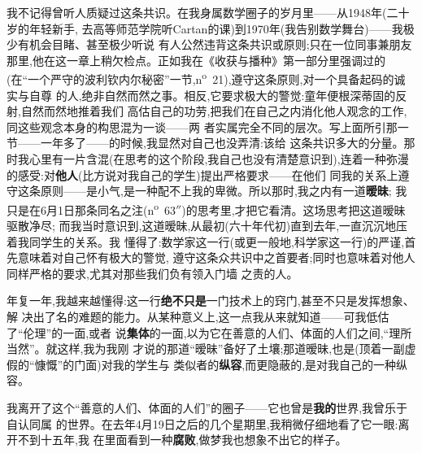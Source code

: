 我不记得曾听人质疑过这条共识。在我身属数学圈子的岁月里——从1948年(二十岁的年轻新手,
去高等师范学院听Cartan的课)到1970年(我告别数学舞台)——我极少有机会目睹、甚至极少听说
有人公然违背这条共识或原则;只在一位同事兼朋友那里,他在这一章上稍欠检点。正如我在《收获与播种》第一部分里强调过的
(在“一个严守的波利钦内尔秘密”一节,n\textsuperscript{o}~21),遵守这条原则,对一个具备起码的诚实与自尊
的人,绝非自然而然之事。相反,它要求极大的警觉:童年便根深蒂固的反射,自然而然地推着我们
高估自己的功劳,把我们在自己之内消化他人观念的工作,同这些观念本身的构思混为一谈——两
者实属完全不同的层次。写上面所引那一节——一年多了——的时候,我显然对自己也没弄清:该给
这条共识多大的分量。那时我心里有一片含混(在思考的这个阶段,我自己也没有清楚意识到\dmark{}),连着一种弥漫的感受:对\textbf{他人}(比方说对我自己的学生)提出严格要求——在他们
同我的关系上遵守这条原则——是小气,是一种配不上我的卑微。所以那时,我之内有一道\textbf{暧昧};
我只是在6月1日那条同名之注(n\textsuperscript{o}~63$''$)的思考里,才把它看清。这场思考把这道暧昧驱散净尽;
而我当时意识到,这道暧昧,从最初(六十年代初)直到去年,一直沉沉地压着我同学生的关系。我
懂得了:数学家这一行(或更一般地,科学家这一行)的严谨,首先意味着对自己怀有极大的警觉,
遵守这条众共识中之首要者;同时也意味着对他人同样严格的要求,尤其对那些我们负有领入门墙
之责的人。

年复一年,我越来越懂得:这一行\textbf{绝不只是}一门技术上的窍门,甚至不只是发挥想象、解
决出了名的难题的能力。从某种意义上,这一点我从来就知道——可我低估了“伦理”的一面,或者
说\textbf{集体}的一面,以为它在善意的人们、体面的人们之间,“理所当然”。就这样,我为我刚
才说的那道“暧昧”备好了土壤;那道暧昧,也是(顶着一副虚假的“慷慨”的门面)对我的学生与
类似者的\textbf{纵容},而更隐蔽的,是对我自己的一种纵容。

我离开了这个“善意的人们、体面的人们”的圈子——它也曾是\textbf{我的}世界,我曾乐于自认同属
的世界。在去年4月19日之后的几个星期里,我稍微仔细地看了它一眼:离开不到十五年,我
在里面看到一种\textbf{腐败},做梦我也想象不出它的样子。

